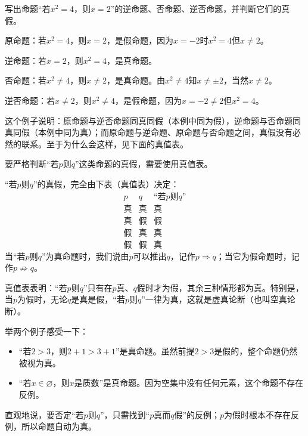 \begin{example}
写出命题“若$x^2=4$，则$x=2$”的逆命题、否命题、逆否命题，并判断它们的真假。
\end{example}
\begin{jie}
    原命题：若$x^2=4$，则$x=2$，是假命题，因为$x=-2$时$x^2=4$但$x\neq 2$。

    逆命题：若$x=2$，则$x^2=4$，是真命题。

    否命题：若$x^2\neq 4$，则$x\neq 2$，是真命题。由$x^2\neq 4$知$x\neq\pm 2$，当然$x\neq 2$。

    逆否命题：若$x\neq 2$，则$x^2\neq 4$，是假命题，因为$x=-2\neq 2$但$x^2=4$。
\end{jie}

\begin{zhu}
这个例子说明：原命题与逆否命题同真同假（本例中同为假），逆命题与否命题同真同假（本例中同为真）；而原命题与逆命题、原命题与否命题之间，真假没有必然的联系。至于为什么会这样，见下面的真值表。
\end{zhu}

要严格判断“若$p$则$q$”这类命题的真假，需要使用真值表。

\begin{definition}[“若$p$则$q$”的真值表]
“若$p$则$q$”的真假，完全由下表（真值表）决定：
\[
\begin{array}{c|c||c}
p & q & \text{“若}p\text{则}q\text{”}\\\hline
\text{真} & \text{真} & \text{真}\\
\text{真} & \text{假} & \text{假}\\
\text{假} & \text{真} & \text{真}\\
\text{假} & \text{假} & \text{真}
\end{array}
\]
当“若$p$则$q$”为真命题时，我们说由$p$可以推出$q$，记作$p\Rightarrow q$；当它为假命题时，记作$p\not\Rightarrow q$。
\end{definition}

\begin{zhu}
真值表表明：“若$p$则$q$”只有在$p$真、$q$假时才为假，其余三种情形都为真。特别是，当$p$为假时，无论$q$是真是假，“若$p$则$q$”一律为真，这就是虚真论断（也叫空真论断）。

举两个例子感受一下：
\begin{itemize}
    \item “若$2>3$，则$2+1>3+1$”是真命题。虽然前提$2>3$是假的，整个命题仍然被视为真。
    \item “若$x\in\varnothing$，则$x$是质数”是真命题。因为空集中没有任何元素，这个命题不存在反例。
\end{itemize}
直观地说，要否定“若$p$则$q$”，只需找到“$p$真而$q$假”的反例；$p$为假时根本不存在反例，所以命题自动为真。
\end{zhu}

